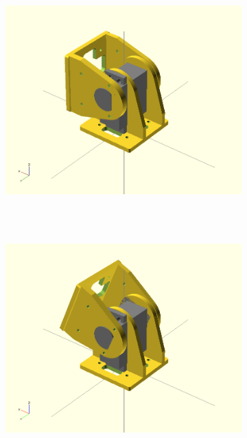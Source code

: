 \begin{figure}[h]
\begin{subfigure}[b]{0.18\textwidth}
                \label{fig:Gait_osc_offset_22_5-2}
        \end{subfigure}
        ~
        \begin{subfigure}[b]{0.18\textwidth}
                \centering
                \includegraphics[width=\textwidth]{images/Gait_osc_offset_0.png}
                 ~
                \label{fig:Gait_osc_offset_0-2}
        \end{subfigure}
        ~
        \begin{subfigure}[b]{0.18\textwidth}
         	   \centering
                \includegraphics[width=\textwidth]{images/Gait_osc_offset_22_5.png}

\end{subfigure}
\end{figure}
